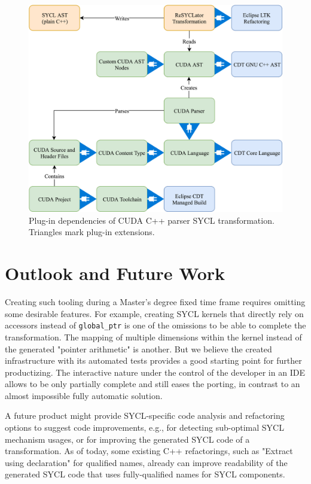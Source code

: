 \documentclass[sigconf]{acmart}
\newcommand{\tcode}[1]{\texttt{#1}}
\begin{document}
\begin{figure}[h]
  \centering
  \includegraphics[width=\linewidth]{ResultSchemaSimple}
  \caption{Plug-in dependencies of CUDA C++ parser SYCL transformation. Triangles mark plug-in extensions.}
  \label{fig:toolarch}
\end{figure}

\section{Outlook and Future Work}
Creating such tooling during a Master's degree fixed time frame requires omitting some desirable features. For example, creating SYCL kernels that directly rely on accessors instead of \tcode{global_ptr} is one of the omissions to be able to complete the transformation. The mapping of multiple dimensions within the kernel instead of the generated "pointer arithmetic" is another. But we believe the created infrastructure with its automated tests provides a good starting point for further productizing. The interactive nature under the control of the developer in an IDE allows to be only partially complete and still eases the porting, in contrast to an almost impossible fully automatic solution. 

A future product might provide SYCL-specific code analysis and refactoring options to suggest code improvements, e.g., for detecting sub-optimal SYCL mechanism usages, or for improving the generated SYCL code of a transformation. As of today, some existing C++ refactorings, such as "Extract using declaration" for qualified names, already can improve readability of the generated SYCL code that uses fully-qualified names for SYCL components.
\end{document}

